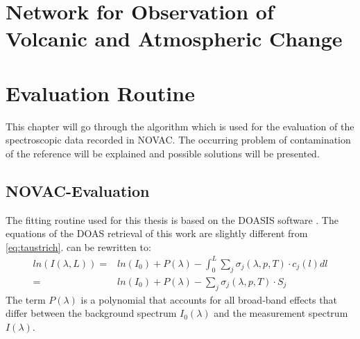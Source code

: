 \documentclass  [
  paper    = a4,
  BCOR     = 10mm,
  twoside,
  fontsize = 12pt,
  fleqn,
  toc      = bibnumbered,
  toc      = listofnumbered,
  numbers  = noendperiod,
  headings = normal,
  listof   = leveldown,
  version  = 3.03
]                                       {scrreprt}
\begin{document}
	
	\chapter{Network for Observation of Volcanic and Atmospheric Change \label{NOVAC}}
	
	
	\chapter{Evaluation Routine}
		This chapter will go through the algorithm which is used for the evaluation of the spectroscopic data recorded in NOVAC. 
		The occurring problem of contamination of the reference will be explained and possible solutions will be presented.
		 
	\section{NOVAC-Evaluation}
		The fitting routine used for this thesis is based on the DOASIS software \cite{kraus2006doasis}. 
		The equations of the DOAS retrieval of this work are slightly different from \cref{eq:taustrich}.
		 can be rewritten to:
		\begin{align}
		ln\left(I\left(\lambda, L\right)\right) = &ln\left(I_0 \right) + P \left(\lambda\right) -	\int_{0}^{L}\sum_{j}\sigma_j \left(\lambda, p, T \right) \cdot c_j \left(l\right)dl \nonumber \\
		= &ln\left(I_0 \right) + P \left(\lambda\right)-
		\sum_{j}\sigma_j \left(\lambda, p, T \right) \cdot S_j
		\label{eq:lben}
		\end{align}
		The term $ P \left(\lambda\right)$ is a polynomial that accounts for all broad-band effects that differ between the background spectrum $I_0\left(\lambda\right)$ and the measurement spectrum $I\left(\lambda\right)$.\\
\end{document}
